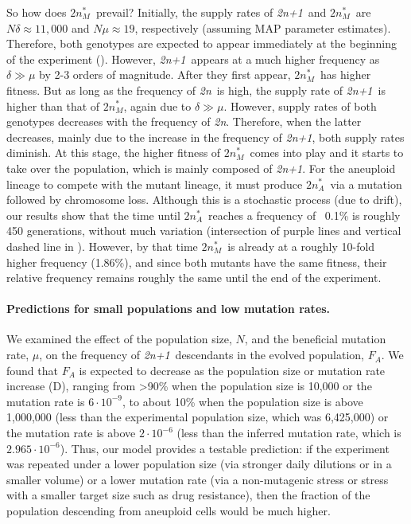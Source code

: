 \documentclass[12pt]{extarticle}
\newcommand{\euwt}{\emph{2n}}
\newcommand{\anwt}{\emph{2n+1}}
\newcommand{\eumtM}{\emph{$2n^*_M$}}
\newcommand{\eumtA}{\emph{$2n^*_A$}}
\begin{document}
So how does \eumtM\ prevail?
Initially, the supply rates of \anwt\ and \eumtM\ are $N \delta \approx 11,000$ and $N \mu \approx 19$, respectively (assuming MAP parameter estimates). 
Therefore, both genotypes are expected to appear immediately at the beginning of the experiment ().
However, \anwt\ appears at a much higher frequency as $\delta \gg \mu$ by 2-3 orders of magnitude.
After they first appear, \eumtM\ has higher fitness.
But as long as the frequency of \euwt\ is high, the supply rate of \anwt\ is higher than that of \eumtM, again due to $\delta \gg \mu$. 
However, supply rates of both genotypes decreases with the frequency of \euwt.
Therefore, when the latter decreases, mainly due to the increase in the frequency of \anwt, both supply rates diminish.
At this stage, the higher fitness of \eumtM\ comes into play and it starts to take over the population, which is mainly composed of \anwt.
For the aneuploid lineage to compete with the mutant lineage, it must produce \eumtA\ via a mutation followed by chromosome loss.
Although this is a stochastic process (due to drift), our results show that the time until \eumtA\ reaches a frequency of ~0.1\% is roughly 450 generations, without much variation (intersection of purple lines and vertical dashed line in ).
However, by that time \eumtM\ is already at a roughly 10-fold higher frequency (1.86\%), and since both mutants have the same fitness, their relative frequency remains roughly the same until the end of the experiment. 

\paragraph{Predictions for small populations and low mutation rates.}
We examined the effect of the population size, $N$, and the beneficial mutation rate, $\mu$, on the frequency of \anwt\ descendants in the evolved population, $F_A$.
We found that $F_A$ is expected to decrease as the population size or mutation rate increase (D), ranging from >90\% when the population size is 10,000 or the mutation rate is $6\cdot10^{-9}$, to about 10\% when the population size is above 1,000,000 (less than the experimental population size, which was 6,425,000) or the mutation rate is above $2\cdot10^{-6}$ (less than the inferred mutation rate, which is $2.965\cdot10^{-6}$). 
Thus, our model provides a testable prediction: if the experiment was repeated under a lower population size (via stronger daily dilutions or in a smaller volume) or a lower mutation rate (via a non-mutagenic stress or stress with a smaller target size such as drug resistance), then the fraction of the population descending from aneuploid cells would be much higher.
\end{document}

